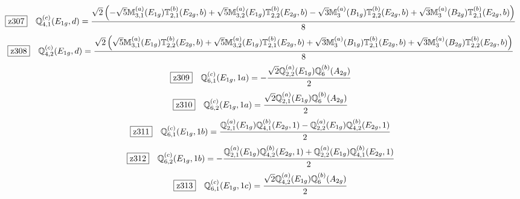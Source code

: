 \documentclass[fleqn,10pt,landscape]{jsarticle}
\begin{document}
\begin{dmath*}
\hspace*{3mm}\fbox{z307}\quad \mathbb{Q}_{4,1}^{(c)}(E_{1g},d)=\frac{\sqrt{2} \left(- \sqrt{5} \mathbb{M}_{3,1}^{(a)}(E_{1g}) \mathbb{T}_{2,1}^{(b)}(E_{2g},b) + \sqrt{5} \mathbb{M}_{3,2}^{(a)}(E_{1g}) \mathbb{T}_{2,2}^{(b)}(E_{2g},b) - \sqrt{3} \mathbb{M}_{3}^{(a)}(B_{1g}) \mathbb{T}_{2,2}^{(b)}(E_{2g},b) + \sqrt{3} \mathbb{M}_{3}^{(a)}(B_{2g}) \mathbb{T}_{2,1}^{(b)}(E_{2g},b)\right)}{8}
\end{dmath*}
\begin{dmath*}
\hspace*{3mm}\fbox{z308}\quad \mathbb{Q}_{4,2}^{(c)}(E_{1g},d)=\frac{\sqrt{2} \left(\sqrt{5} \mathbb{M}_{3,1}^{(a)}(E_{1g}) \mathbb{T}_{2,2}^{(b)}(E_{2g},b) + \sqrt{5} \mathbb{M}_{3,2}^{(a)}(E_{1g}) \mathbb{T}_{2,1}^{(b)}(E_{2g},b) + \sqrt{3} \mathbb{M}_{3}^{(a)}(B_{1g}) \mathbb{T}_{2,1}^{(b)}(E_{2g},b) + \sqrt{3} \mathbb{M}_{3}^{(a)}(B_{2g}) \mathbb{T}_{2,2}^{(b)}(E_{2g},b)\right)}{8}
\end{dmath*}
\begin{dmath*}
\hspace*{3mm}\fbox{z309}\quad \mathbb{Q}_{6,1}^{(c)}(E_{1g},1a)=- \frac{\sqrt{2} \mathbb{Q}_{2,2}^{(a)}(E_{1g}) \mathbb{Q}_{6}^{(b)}(A_{2g})}{2}
\end{dmath*}
\begin{dmath*}
\hspace*{3mm}\fbox{z310}\quad \mathbb{Q}_{6,2}^{(c)}(E_{1g},1a)=\frac{\sqrt{2} \mathbb{Q}_{2,1}^{(a)}(E_{1g}) \mathbb{Q}_{6}^{(b)}(A_{2g})}{2}
\end{dmath*}
\begin{dmath*}
\hspace*{3mm}\fbox{z311}\quad \mathbb{Q}_{6,1}^{(c)}(E_{1g},1b)=\frac{\mathbb{Q}_{2,1}^{(a)}(E_{1g}) \mathbb{Q}_{4,1}^{(b)}(E_{2g},1) - \mathbb{Q}_{2,2}^{(a)}(E_{1g}) \mathbb{Q}_{4,2}^{(b)}(E_{2g},1)}{2}
\end{dmath*}
\begin{dmath*}
\hspace*{3mm}\fbox{z312}\quad \mathbb{Q}_{6,2}^{(c)}(E_{1g},1b)=- \frac{\mathbb{Q}_{2,1}^{(a)}(E_{1g}) \mathbb{Q}_{4,2}^{(b)}(E_{2g},1) + \mathbb{Q}_{2,2}^{(a)}(E_{1g}) \mathbb{Q}_{4,1}^{(b)}(E_{2g},1)}{2}
\end{dmath*}
\begin{dmath*}
\hspace*{3mm}\fbox{z313}\quad \mathbb{Q}_{6,1}^{(c)}(E_{1g},1c)=\frac{\sqrt{2} \mathbb{Q}_{4,2}^{(a)}(E_{1g}) \mathbb{Q}_{6}^{(b)}(A_{2g})}{2}
\end{dmath*}
\end{document}

